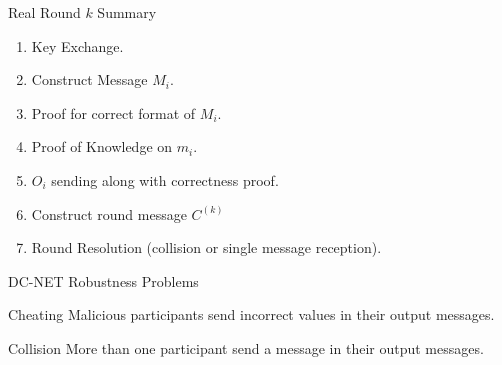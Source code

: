 \begin{frame}{Real Round $k$ Summary}
    \begin{enumerate}
        \item Key Exchange.
        \item Construct Message $M_i$.
        \item Proof for correct format of $M_i$.
        \item Proof of Knowledge on $m_i$.
        \item $O_i$ sending along with correctness proof.
        \item Construct round message $C^{(k)}$
        \item Round Resolution (collision or single message reception).
    \end{enumerate}
\end{frame}

\begin{frame}{DC-NET Robustness Problems}
    
    \begin{exampleblock}{Cheating}
        Malicious participants send incorrect values in their output messages.
    \end{exampleblock}
    
    \begin{exampleblock}{Collision}
        More than one participant send a message in their output messages.
    \end{exampleblock}
    
\end{frame}